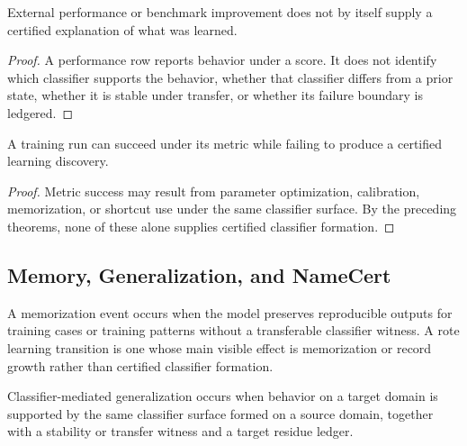 \begin{theorem}
\label{thm:philosophy-performance-gain-not-certified-explanation}
External performance or benchmark improvement does not by itself supply a
certified explanation of what was learned.
\end{theorem}
\begin{proof}
A performance row reports behavior under a score. It does not identify
which classifier supports the behavior, whether that classifier differs
from a prior state, whether it is stable under transfer, or whether its
failure boundary is ledgered.
\end{proof}

\begin{corollary}
\label{cor:philosophy-training-success-not-structural-learning}
A training run can succeed under its metric while failing to produce a
certified learning discovery.
\end{corollary}
\begin{proof}
Metric success may result from parameter optimization, calibration,
memorization, or shortcut use under the same classifier surface. By the
preceding theorems, none of these alone supplies certified classifier
formation.
\end{proof}

\subsection{Memory, Generalization, and NameCert}
\label{subsec:philosophy-learning-memory-generalization-namecert}

\begin{definition}
\label{def:philosophy-memorization-event}
A memorization event occurs when the model preserves reproducible
outputs for training cases or training patterns without a transferable
classifier witness. A rote learning transition is one whose main visible
effect is memorization or record growth rather than certified classifier
formation.
\end{definition}

\begin{definition}
\label{def:philosophy-classifier-mediated-generalization}
Classifier-mediated generalization occurs when behavior on a target
domain is supported by the same classifier surface formed on a source
domain, together with a stability or transfer witness and a target
residue ledger.
\end{definition}

